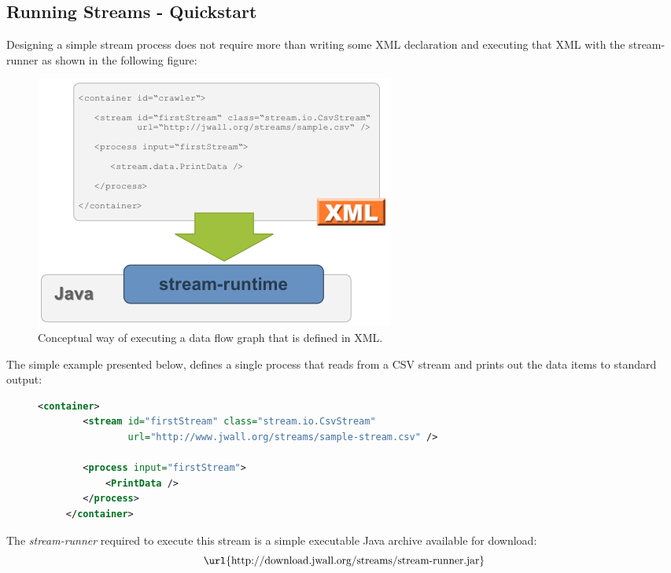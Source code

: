 \subsection{Running Streams - Quickstart}
Designing a simple stream process does not require more than writing
some XML declaration and executing that XML with the stream-runner as
shown in the following figure:

\begin{figure}[h!]
  \centering
  \includegraphics[scale=0.3]{graphics/quickstart-xml}
  \caption{\label{fig:quickstart}Conceptual way of executing a data flow graph that is defined in XML.}
\end{figure}

The simple example presented below, defines a single process that
reads from a CSV stream and prints out the data items to standard
output:

\begin{figure}[h!]
  \centering
  \begin{lstlisting}[language=XML]
    <container>
        <stream id="firstStream" class="stream.io.CsvStream"
                url="http://www.jwall.org/streams/sample-stream.csv" />

        <process input="firstStream">
            <PrintData />
        </process>
     </container>
  \end{lstlisting}
\end{figure}

The {\em stream-runner} required to execute this stream is a simple executable
Java archive available for download:
\begin{displaymath}
  \mbox{\url{http://download.jwall.org/streams/stream-runner.jar}}
\end{displaymath}


